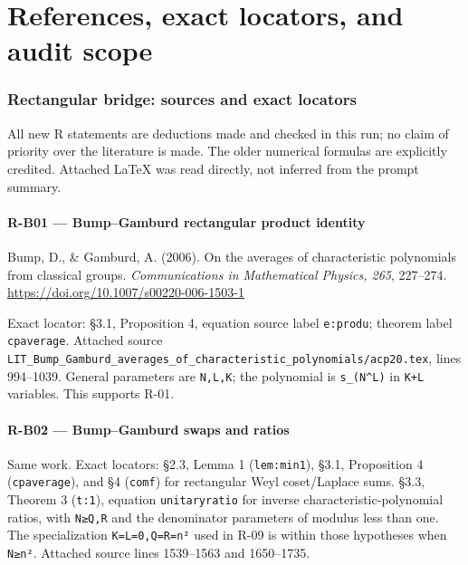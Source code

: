 \documentclass[11pt,a4paper]{article}
\theoremstyle{definition}\newtheorem{definition}{Definition}
\begin{document}
\appendix
\part{References, exact locators, and audit scope}
\section{Rectangular bridge: sources and exact
locators}\label{rectangular-bridge-sources-and-exact-locators}

All new R statements are deductions made and checked in this run; no
claim of priority over the literature is made. The older numerical
formulas are explicitly credited. Attached LaTeX was read directly, not
inferred from the prompt summary.

\subsection{R-B01 --- Bump--Gamburd rectangular product
identity}\label{r-b01--bumpgamburd-rectangular-product-identity}

Bump, D., \& Gamburd, A. (2006). On the averages of characteristic
polynomials from classical groups. \emph{Communications in Mathematical
Physics, 265}, 227--274. \url{https://doi.org/10.1007/s00220-006-1503-1}

Exact locator: §3.1, Proposition 4, equation source label
\nolinkurl{e:produ}; theorem label \nolinkurl{cpaverage}. Attached source
\nolinkurl{LIT_Bump_Gamburd_averages_of_characteristic_polynomials/acp20.tex},
lines 994--1039. General parameters are \nolinkurl{N,L,K}; the polynomial
is \texttt{s\_(N\^{}L)} in \nolinkurl{K+L} variables. This supports R-01.

\subsection{R-B02 --- Bump--Gamburd swaps and
ratios}\label{r-b02--bumpgamburd-swaps-and-ratios}

Same work. Exact locators: §2.3, Lemma 1 (\nolinkurl{lem:min1}), §3.1,
Proposition 4 (\nolinkurl{cpaverage}), and §4 (\nolinkurl{comf}) for
rectangular Weyl coset/Laplace sums. §3.3, Theorem 3 (\nolinkurl{t:1}),
equation \nolinkurl{unitaryratio} for inverse characteristic-polynomial
ratios, with \nolinkurl{N≥Q,R} and the denominator parameters of modulus
less than one. The specialization \nolinkurl{K=L=0,Q=R=n²} used in R-09 is
within those hypotheses when \nolinkurl{N≥n²}. Attached source lines
1539--1563 and 1650--1735.
\end{document}
